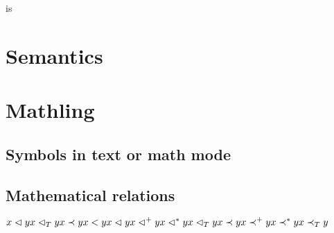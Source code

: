 \documentclass{khplain}
\begin{document}
\begin{examplebox}
\emptyD \emptyT \par
\lv \lvb \lvp \par
\Tpast \Tpres \par
\Tfin \Tinf \par
\end{examplebox}

\begin{examplebox}
\end{examplebox}

\begin{examplebox}
 is 
\end{examplebox}


\section{Semantics}

\begin{examplebox}
 \par
\typeet \par
\typeeet \par
\typeett \par
\typeetet
\end{examplebox}

\begin{examplebox}
\end{examplebox}


\section{Mathling}

\subsection{Symbols in text or math mode}

\begin{examplebox}
    \ledge \redge \tedge \bedge \slot
\end{examplebox}

\subsection{Mathematical relations}

\begin{examplebox}
\begin{math}
x \vartriangleleft y \\
x \vartriangleleft_T y \\
x \prec y \\
x < y \\
x \vartriangleleft y \\
x \vartriangleleft^+ y \\
x \vartriangleleft^* y \\
x \vartriangleleft_T y \\
x \prec y \\
x \prec^+ y \\
x \prec^* y \\
x \prec_T y
\end{math}
\end{examplebox}
\end{document}
